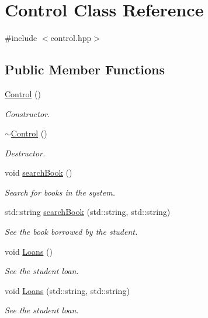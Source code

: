 \hypertarget{classControl}{}\section{Control Class Reference}
\label{classControl}


{\ttfamily \#include $<$control.\+hpp$>$}

\subsection*{Public Member Functions}
\begin{DoxyCompactItemize}
\item 
\hyperlink{classControl_aa730aeda4517f40bc48ba1e46ebded77}{Control} ()
\begin{DoxyCompactList}\small\item\em Constructor. \end{DoxyCompactList}\item 
\hyperlink{classControl_aedda1328c4f8b8d49bca8f0812d3bfd1}{$\sim$\+Control} ()
\begin{DoxyCompactList}\small\item\em Destructor. \end{DoxyCompactList}\item 
void \hyperlink{classControl_a8b6c2e30e71b54786b3ec01e8524076f}{search\+Book} ()
\begin{DoxyCompactList}\small\item\em Search for books in the system. \end{DoxyCompactList}\item 
std\+::string \hyperlink{classControl_a7719518366f488614467555e53a6d0c2}{search\+Book} (std\+::string, std\+::string)
\begin{DoxyCompactList}\small\item\em See the book borrowed by the student. \end{DoxyCompactList}\item 
void \hyperlink{classControl_ad413782c762539562d2ff9401a54eab3}{Loans} ()
\begin{DoxyCompactList}\small\item\em See the student loan. \end{DoxyCompactList}\item 
void \hyperlink{classControl_a4e5343c4033003b873eac91e72c0f8f6}{Loans} (std\+::string, std\+::string)
\begin{DoxyCompactList}\small\item\em See the student loan. \end{DoxyCompactList}\item 

\end{DoxyCompactItemize}
